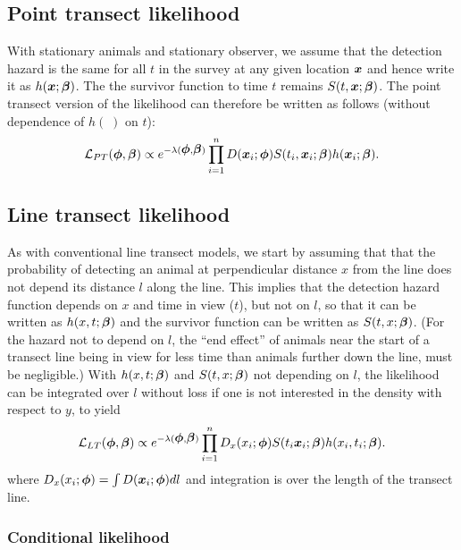 \documentclass[useAMS,usenatbib,referee]{biom}
\begin{document}
\subsection{Point transect likelihood}
With stationary animals and stationary observer, we assume that the detection hazard is the same for all $t$ in the survey at any given location ${\mbox{\boldmath $x$}}$ and hence write it as $h({\mbox{\boldmath $x$}};{\mbox{\boldmath $\beta$}})$. The the survivor function to time $t$ remains $S(t,{\mbox{\boldmath $x$}};{\mbox{\boldmath $\beta$}})$. The point transect version of the likelihood can therefore be written as follows (without dependence of $h(\;)$ on $t$):
\begin{eqnarray}
\mathcal{L}_{PT}({\mbox{\boldmath $\phi$}},{\mbox{\boldmath $\beta$}})\propto e^{-\lambda({\mbox{\boldmath $\phi$}},{\mbox{\boldmath $\beta$}})}\prod^{n}_{i=1}D({\mbox{\boldmath $x$}}_i;{\mbox{\boldmath $\phi$}})S(t_i,{\mbox{\boldmath $x$}}_i;{\mbox{\boldmath $\beta$}})h({\mbox{\boldmath $x$}}_i;{\mbox{\boldmath $\beta$}}).
\end{eqnarray}


\subsection{Line transect likelihood}
As with conventional line transect models, we start by assuming that that the probability of detecting an animal at perpendicular distance $x$ from the line does not depend its distance $l$ along the line. This implies that the detection hazard function depends on $x$ and time in view ($t$), but not on $l$, so that it can be written as $h(x,t;{\mbox{\boldmath $\beta$}})$ and the survivor function can be written as $S(t,x;{\mbox{\boldmath $\beta$}})$. (For the hazard not to depend on $l$, the ``end effect'' of animals near the start of a transect line being in view for less time than animals further down the line, must be negligible.) 
With $h(x,t;{\mbox{\boldmath $\beta$}})$ and $S(t,x;{\mbox{\boldmath $\beta$}})$ not depending on $l$, the likelihood can be integrated over $l$ without loss if one is not interested in the density with respect to $y$, to yield
\begin{eqnarray}
\mathcal{L}_{LT}({\bmt{\phi}},{\bmt{\beta}})\propto e^{-\lambda({\bmt{\phi}},{\bmt{\beta}})}\prod^{n}_{i=1}D_x(x_i;{\bmt{\phi}})S(t_i{\bmt{x}}_i;{\bmt{\beta}})h(x_i,t_i;{\bmt{\beta}}).
\label{eq:LTlik}
\end{eqnarray}
\noindent
where $D_x(x_i;{\mbox{\boldmath $\phi$}})=\int D({\mbox{\boldmath $x$}}_i;{\mbox{\boldmath $\phi$}})dl$ and integration is over the length of the transect line.

\subsubsection{Conditional likelihood}
\end{document}
